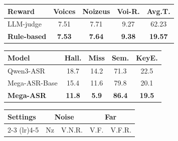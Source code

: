 \documentclass{article}
\begin{document}
\vspace{-2mm}
\begin{table}[t]
\centering
\small
\setlength{\tabcolsep}{3.8pt}
\renewcommand{\arraystretch}{0.92}
\begin{minipage}[t]{0.47\linewidth}
\centering
{}
\label{tab:rm}
\begin{tabular}{lcccc}
\toprule
\textbf{Reward} & \textbf{Voices} & \textbf{Noizeus} & \textbf{Voi-R.} & \textbf{Avg.T.} \\
\midrule
LLM-judge           & 7.51 & 7.71 & 9.27 &  62.23\\
\textbf{Rule-based} & \textbf{7.53} & \textbf{7.64} & \textbf{9.38} & \textbf{19.57} \\
\bottomrule
\end{tabular}
\vspace{1mm}
\label{tab:judge}
\vspace{-2mm}
\begin{tabular}{lcccc}
\toprule
\textbf{Model} & \textbf{Hall.} & \textbf{Miss} & \textbf{Sem.} & \textbf{KeyE.} \\
\midrule
Qwen3-ASR        & 18.7 & 14.2 & 71.3 & 22.5 \\
Mega-ASR-Base    & 15.4 & 11.6 & 79.8 & 20.1 \\
\textbf{Mega-ASR}& \textbf{11.8} & \textbf{5.9} & \textbf{86.4} & \textbf{19.5} \\
\bottomrule
\end{tabular}
\end{minipage}
\hfill
\begin{minipage}[t]{0.5\linewidth}
\centering
\setlength{\tabcolsep}{4.5pt}
\renewcommand{\arraystretch}{1.0}
\small
\vspace{0.5mm}
\vspace{2mm}
\label{tab:hp-alpha}
\begin{tabular}{lcccc}
\toprule
\multirow{2}{*}{\textbf{Settings}}  & \multicolumn{2}{c}{\textbf{Noise}} & \multicolumn{2}{c}{\textbf{Far}} \\
\cmidrule(lr){2-3} \cmidrule(lr){4-5}
 & Nz & V.N.R. & V.F. & V.F.R. \\

\end{tabular}
\end{minipage}
\end{table}
\end{document}
